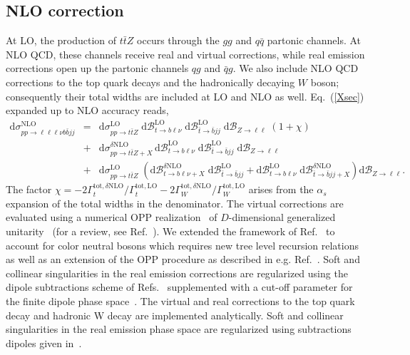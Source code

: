 \documentclass[preprint]{JHEP3} %
\newcommand{\mrm}{\mathrm}
\newcommand{\rd}{\mathrm{d}}
\newcommand{\Br}{\mathcal{B}}
\def\ttbZ{t\bar{t}Z}
\newcommand{\be}{\begin{eqnarray}}
\newcommand{\ee}{\end{eqnarray}}
\begin{document}
\subsection{NLO correction}
At LO, the production of $\ttbZ$ occurs through the $gg$ and $q\bar{q}$ partonic channels. 
At NLO QCD, these channels receive real and virtual corrections, while real emission corrections open up the partonic channels $qg$ and $\bar{q}g$. 
We also include NLO QCD corrections to the top quark decays and the hadronically decaying $W$ boson; consequently their total widths are included at LO and NLO as well.
Eq.~(\ref{Xsec}) expanded up to NLO accuracy reads,
\be
 \rd \sigma_{pp\to\ell\ell\ell\nu b \bar{b} jj}^\mrm{NLO} &=& 
 \rd \sigma_{pp\to\ttbZ}^\mrm{LO} \; \rd\Br_{t\to b \ell\nu}^\mrm{LO} \; \rd\Br_{\bar{t} \to \bar{b} jj}^\mrm{LO} \; \rd\Br_{Z\to \ell\ell}
 \; \left( 1 + \chi \right)
\nonumber \\
 &+&   \rd \sigma_{pp\to\ttbZ+X}^{\delta \mrm{NLO}}  \, \rd\Br_{t\to b \ell\nu}^\mrm{LO} \; \rd\Br_{\bar{t} \to \bar{b} jj}^\mrm{LO} \; \rd\Br_{Z\to \ell\ell}
\nonumber \\
 &+&  \rd \sigma_{pp\to\ttbZ}^\mrm{LO} \; \left(  \rd\Br_{t\to b \ell\nu+X}^{\delta\mrm{NLO}} \; \rd\Br_{\bar{t} \to \bar{b} jj}^\mrm{LO} + \rd\Br_{t\to b \ell\nu}^\mrm{LO} \; \rd\Br_{\bar{t} \to \bar{b} jj+X}^{\delta\mrm{NLO}} \right) \rd\Br_{Z\to \ell\ell}
. \label{XsecNLO}
\ee
The factor $\chi= -2 \Gamma_t^{\mrm{tot},\delta\mrm{NLO}}/\Gamma_t^{\mrm{tot,LO}} -2 \Gamma_W^{\mrm{tot},\delta\mrm{NLO}}/\Gamma_W^{\mrm{tot,LO}} $ arises from the $\alpha_s$ expansion
of the total widths in the denominator.
The virtual corrections are evaluated using a numerical OPP realization~\cite{Ossola:2006} of $D$-dimensional generalized unitarity~\cite{Ellis:2007br,Giele:2008ve,Ellis:2008ir} (for a review, see Ref.~\cite{Ellis:2011}).
We extended the framework of Ref.~\cite{Melnikov:2009dn} to account for color neutral bosons which requires new tree level recursion relations as well as an extension of the OPP procedure as described in e.g. Ref.~\cite{}.
Soft and collinear singularities in the real emission corrections are regularized using the dipole subtractions scheme of Refs.~\cite{Catani:1996vz,Catani:2002hc} supplemented with a cut-off parameter for the
finite dipole phase space~\cite{Nagy:2003tz,Nagy:2003tz,copy from ttbphoton paper}.
The virtual and real corrections to the top quark decay and hadronic W decay are implemented analytically. 
Soft and collinear singularities in the real emission phase space are regularized using subtractions dipoles given in~\cite{see ttbphoton paper}.
\end{document}
